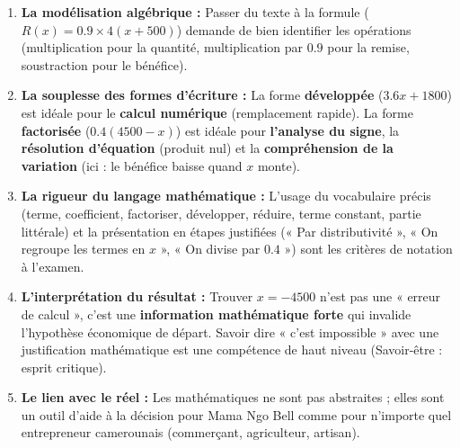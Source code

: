 \documentclass[11pt]{article}
\begin{document}
\begin{enumerate}
    \item \textbf{La modélisation algébrique :} Passer du texte à la formule ($R(x) = \num{0,9} \times 4(x+500)$) demande de bien identifier les opérations (multiplication pour la quantité, multiplication par $\num{0,9}$ pour la remise, soustraction pour le bénéfice).
    \item \textbf{La souplesse des formes d'écriture :} La forme \textbf{développée} ($\num{3,6}x + 1800$) est idéale pour le \textbf{calcul numérique} (remplacement rapide). La forme \textbf{factorisée} ($\num{0,4}(4500-x)$) est idéale pour \textbf{l'analyse du signe}, la \textbf{résolution d'équation} (produit nul) et la \textbf{compréhension de la variation} (ici : le bénéfice baisse quand $x$ monte).
    \item \textbf{La rigueur du langage mathématique :} L'usage du vocabulaire précis (terme, coefficient, factoriser, développer, réduire, terme constant, partie littérale) et la présentation en étapes justifiées (« Par distributivité », « On regroupe les termes en $x$ », « On divise par $\num{0,4}$ ») sont les critères de notation à l'examen.
    \item \textbf{L'interprétation du résultat :} Trouver $x = -4500$ n'est pas une « erreur de calcul », c'est une \textbf{information mathématique forte} qui invalide l'hypothèse économique de départ. Savoir dire « c'est impossible » avec une justification mathématique est une compétence de haut niveau (Savoir-être : esprit critique).
    \item \textbf{Le lien avec le réel :} Les mathématiques ne sont pas abstraites ; elles sont un outil d'aide à la décision pour Mama Ngo Bell comme pour n'importe quel entrepreneur camerounais (commerçant, agriculteur, artisan).
\end{enumerate}
\end{document}
